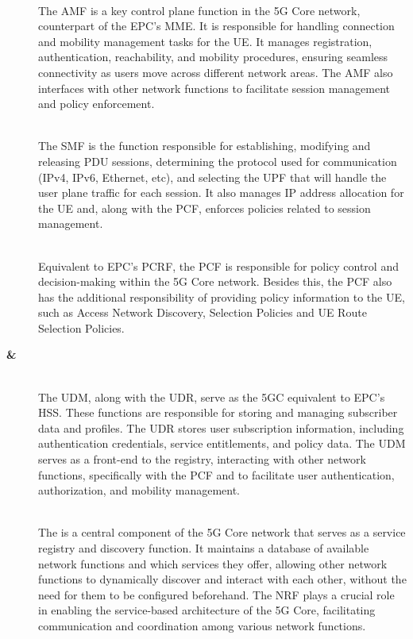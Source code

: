 \begin{description}
  \item[\textbf{}]~\\
  The \gls{AMF} is a key control plane function in the 5G Core network, counterpart of the \gls{EPC}'s  \gls{MME}. It is responsible for handling connection and mobility management tasks for the \gls{UE}. It manages registration, authentication, reachability, and mobility procedures, ensuring seamless connectivity as users move across different network areas. The AMF also interfaces with other network functions to facilitate session management and policy enforcement.
  
  \item[\textbf{}]~\\
  The \gls{SMF} is the function responsible for establishing, modifying and releasing \gls{PDU} sessions, determining the protocol used for communication (IPv4, IPv6, Ethernet, etc), and selecting the \gls{UPF} that will handle the user plane traffic for each session. It also manages IP address allocation for the \gls{UE} and, along with the \gls{PCF}, enforces policies related to session management.

  \item[\textbf{}]~\\ 
  Equivalent to \gls{EPC}'s \gls{PCRF}, the \gls{PCF} is responsible for policy control and decision-making within the 5G Core network. Besides this, the \gls{PCF} also has the additional responsibility of providing policy information to the \gls{UE}, such as Access Network Discovery, Selection Policies and UE Route Selection Policies.

  \item[\textbf{ \& }]~\\
  The \gls{UDM}, along with the \gls{UDR}, serve as the 5GC equivalent to \gls{EPC}'s \gls{HSS}. These functions are responsible for storing and managing subscriber data and profiles. The \gls{UDR} stores user subscription information, including authentication credentials, service entitlements, and policy data. The \gls{UDM} serves as a front-end to the registry, interacting with other network functions, specifically with the \gls{PCF} and  to facilitate user authentication, authorization, and mobility management.

  \item[\textbf{}]~\\ 
  The  is a central component of the 5G Core network that serves as a service registry and discovery function. It maintains a database of available network functions and which services they offer, allowing other network functions to dynamically discover and interact with each other, without the need for them to be configured beforehand. The NRF plays a crucial role in enabling the service-based architecture of the 5G Core, facilitating communication and coordination among various network functions.


\end{description}
